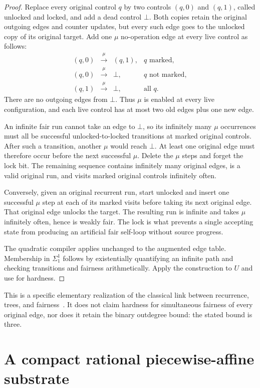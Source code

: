\documentclass[11pt,letterpaper]{article}
\theoremstyle{definition}
\theoremstyle{remark}
\newcommand{\1}{\mathbf 1}
\begin{document}
\begin{proof}
Replace every original control $q$ by two controls $(q,0)$ and $(q,1)$,
called unlocked and locked, and add a dead control $\bot$. Both copies
retain the original outgoing edges and counter updates, but every such edge
goes to the unlocked copy of its original target. Add one $\mu$ no-operation
edge at every live control as follows:
\[
 \begin{array}{rcll}
 (q,0)&\xrightarrow{\mu}&(q,1),&q\text{ marked},\\
 (q,0)&\xrightarrow{\mu}&\bot,&q\text{ not marked},\\
 (q,1)&\xrightarrow{\mu}&\bot,&\text{all }q.
 \end{array}
\]
There are no outgoing edges from $\bot$. Thus $\mu$ is enabled at every
live configuration, and each live control has at most two old edges plus
one new edge.

An infinite fair run cannot take an edge to $\bot$, so its infinitely many
$\mu$ occurrences must all be successful unlocked-to-locked transitions at
marked original controls. After such a transition, another $\mu$ would
reach $\bot$. At least one original edge must therefore occur before the
next successful $\mu$. Delete the $\mu$ steps and forget the lock bit. The
remaining sequence contains infinitely many original edges, is a valid
original run, and visits marked original controls infinitely often.

Conversely, given an original recurrent run, start unlocked and insert one
successful $\mu$ step at each of its marked visits before taking its next
original edge. That original edge unlocks the target. The resulting run is
infinite and takes $\mu$ infinitely often, hence is weakly fair. The lock is
what prevents a single accepting state from producing an artificial fair
self-loop without source progress.

The quadratic compiler applies unchanged to the augmented edge table.
Membership in $\Sigma^1_1$ follows by existentially quantifying an infinite
path and checking transitions and fairness arithmetically. Apply the
construction to $U$ and use  for hardness.
\end{proof}

This is a specific elementary realization of the classical link between
recurrence, trees, and fairness~\cite{harel1986}. It does not claim hardness
for simultaneous fairness of every original edge, nor does it retain the
binary outdegree bound: the stated bound is three.
\section{A compact rational piecewise-affine substrate}\label{lbh:sec:geometry}
\end{document}
